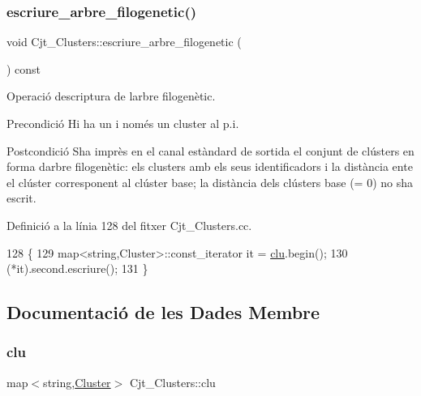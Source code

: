 \subsubsection{\texorpdfstring{escriure\+\_\+arbre\+\_\+filogenetic()}{escriure\_arbre\_filogenetic()}}
{\footnotesize\ttfamily void Cjt\+\_\+\+Clusters\+::escriure\+\_\+arbre\+\_\+filogenetic (\begin{DoxyParamCaption}{ }\end{DoxyParamCaption}) const}



Operació d\textquotesingle{}escriptura de l\textquotesingle{}arbre filogenètic. 

\begin{DoxyPrecond}{Precondició}
Hi ha un i només un cluster al p.\+i. 
\end{DoxyPrecond}
\begin{DoxyPostcond}{Postcondició}
S\textquotesingle{}ha imprès en el canal estàndard de sortida el conjunt de clústers en forma d\textquotesingle{}arbre filogenètic\+: els clusters amb els seus identificadors i la distància ente el clúster corresponent al clúster base; la distància dels clústers base (= 0) no s\textquotesingle{}ha escrit. 
\end{DoxyPostcond}


Definició a la línia 128 del fitxer Cjt\+\_\+\+Clusters.\+cc.


\begin{DoxyCode}
128                                                     \{
129     map<string,Cluster>::const\_iterator it = \hyperlink{class_cjt___clusters_a86fd6089c4e49eaedea86d5ec4ee6495}{clu}.begin();
130     (*it).second.escriure();
131 \}
\end{DoxyCode}


\subsection{Documentació de les Dades Membre}
\mbox{\label{class_cjt___clusters_a86fd6089c4e49eaedea86d5ec4ee6495}} 
\subsubsection{\texorpdfstring{clu}{clu}}
{\footnotesize\ttfamily map$<$string,\hyperlink{class_cluster}{Cluster}$>$ Cjt\+\_\+\+Clusters\+::clu\hspace{0.3cm}{\ttfamily [private]}}



